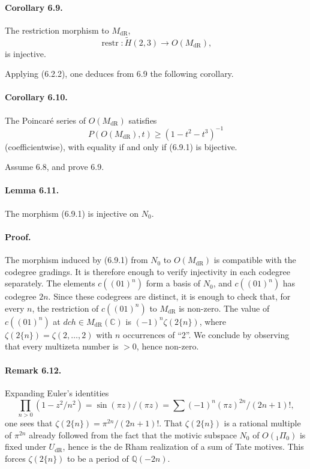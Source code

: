 \documentclass[10pt]{article}
\newcommand{\Q}{\mathbb Q}
\newcommand{\C}{\mathbb C}
\newcommand{\dR}{\mathrm{dR}}
\begin{document}
\paragraph{Corollary 6.9.}
The restriction morphism to $M_{\dR}$,
\begin{equation}
\operatorname{restr}:\widetilde H(2,3)\longrightarrow O(M_{\dR}),
\tag{6.9.1}
\end{equation}
is injective.

Applying (6.2.2), one deduces from 6.9 the following corollary.

\paragraph{Corollary 6.10.}
The Poincaré series of $O(M_{\dR})$ satisfies
\begin{equation}
P(O(M_{\dR}),t)\geq(1-t^2-t^3)^{-1}
\tag{6.10.1}
\end{equation}
(coefficientwise), with equality if and only if (6.9.1) is bijective.

Assume 6.8, and prove 6.9.

\paragraph{Lemma 6.11.}
The morphism (6.9.1) is injective on $N_0$.

\paragraph{Proof.}
The morphism induced by (6.9.1) from $N_0$ to $O(M_{\dR})$ is compatible with the codegree gradings. It is therefore enough to verify injectivity in each codegree separately. The elements $c((01)^n)$ form a basis of $N_0$, and $c((01)^n)$ has codegree $2n$. Since these codegrees are distinct, it is enough to check that, for every $n$, the restriction of $c((01)^n)$ to $M_{\dR}$ is non-zero. The value of $c((01)^n)$ at $dch\in M_{\dR}(\C)$ is $(-1)^n\zeta(2\{n\})$, where $\zeta(2\{n\})=\zeta(2,\ldots,2)$ with $n$ occurrences of ``2''. We conclude by observing that every multizeta number is $>0$, hence non-zero.

\paragraph{Remark 6.12.}
Expanding Euler's identities
\[
\prod_{n>0}(1-z^2/n^2)=\sin(\pi z)/(\pi z)=\sum (-1)^n(\pi z)^{2n}/(2n+1)!,
\]
one sees that $\zeta(2\{n\})=\pi^{2n}/(2n+1)!$. That $\zeta(2\{n\})$ is a rational multiple of $\pi^{2n}$ already followed from the fact that the motivic subspace $N_0$ of $O({}_1\Pi_0)$ is fixed under $U_{\dR}$, hence is the de Rham realization of a sum of Tate motives. This forces $\zeta(2\{n\})$ to be a period of $\Q(-2n)$.
\end{document}
